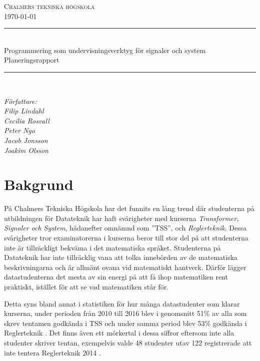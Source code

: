 \documentclass{article}
\begin{document}
\begin{titlepage} \newcommand{\HRule}{\rule{\linewidth}{0.3mm}}
\center
\textsc{\Large Chalmers tekniska högskola}\\[0.05cm] %
\normalsize \today

\HRule \\[0.08cm]
{ \large  Programmering som undervisningsverktyg för signaler och system \\ \normalsize{Planeringsrapport}}\\[0.08cm] %
\HRule \\[0.3cm]


\vfill

\begin{flushleft} \small
    \emph{Författare: \\
    \quad Filip Lindahl\\
    \quad Cecilia Rosvall\\
    \quad Peter Ngo\\
    \quad Jacob Jonsson\\
    \quad Joakim Olsson\\}
\end{flushleft}
\end{titlepage}
\newpage
\tableofcontents
\newpage

\section{Bakgrund}
På Chalmers Tekniska Högskola har det funnits en lång trend
där studenterna på utbildningen för Datateknik har haft
svårigheter med kurserna \textit{Transformer, Signaler och System},
hädanefter omnämnd som ''TSS'', och \textit{Reglerteknik}.
Dessa svårigheter tror examinatorerna i kurserna beror till
stor del på att studenterna inte är tillräckligt bekväma
i det matematiska språket.
Studenterna på Datateknik har inte tillräcklig vana att
tolka innebörden av de matematiska beskrivningarna och är
allmänt ovana vid matematiskt hantverk.
Därför lägger datastudenterna det mesta av sin energi
på att få ihop matematiken rent praktiskt,
istället för att se vad matematiken står för.

Detta syns bland annat i statistiken för hur många
datastudenter som klarar kurserna, under perioden från
2010 till 2016 blev i genomsnitt 51\% av alla som skrev
tentamen godkända i TSS och under samma period blev
53\% godkända i Reglerteknik \cite{tentastatistik}.
Det finns även ett mörkertal i dessa siffror eftersom
inte alla studenter skriver tentan, exempelvis
valde 48 studenter utav 122 registrerade att inte
tentera Reglerteknik 2014 \cite{kursinformation:ere102:14-15}.
\end{document}

